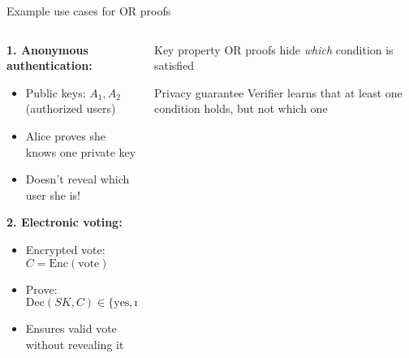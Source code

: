 \documentclass[aspectratio=169, lualatex, handout]{beamer}
\begin{document}
\begin{frame}{Example use cases for OR proofs}
	\begin{columns}[c]
		\begin{column}{0.6\textwidth}
			\textbf{1. Anonymous authentication:}
			\begin{itemize}
				\item Public keys: $A_1, A_2$ (authorized users)
				\item Alice proves she knows one private key
				\item Doesn't reveal which user she is!
			\end{itemize}
			\textbf{2. Electronic voting:}
			\begin{itemize}
				\item Encrypted vote: $C = \text{Enc}(\text{vote})$
				\item Prove: $\text{Dec}(SK, C) \in \{\text{yes}, \text{no}\}$
				\item Ensures valid vote without revealing it
			\end{itemize}
		\end{column}
		\begin{column}{0.4\textwidth}
			\begin{exampleblock}{Key property}
				OR proofs hide \textit{which} condition is satisfied
			\end{exampleblock}
			\begin{alertblock}{Privacy guarantee}
				Verifier learns that at least one condition holds, but not which one
			\end{alertblock}
		\end{column}
	\end{columns}
\end{frame}
\end{document}

